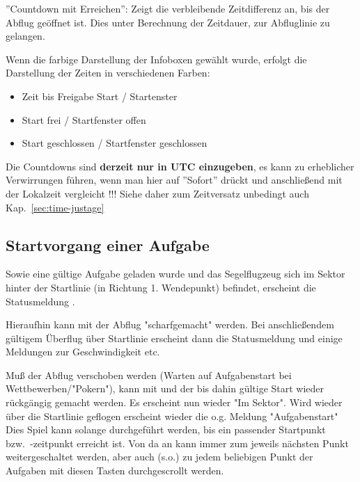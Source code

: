 ''Countdown mit Erreichen'':
Zeigt die verbleibende Zeitdifferenz an, bis der Abflug geöffnet ist. 
Dies unter Berechnung der Zeitdauer, zur Abfluglinie zu gelangen. 


Wenn die farbige Darstellung der Infoboxen gewählt wurde, erfolgt die Darstellung der Zeiten in verschiedenen 
Farben:

\begin{itemize}
 \item[]   Zeit bis Freigabe Start / Startenster
 \item[]   Start frei / Startfenster offen 
 \item[]   Start geschlossen / Startfenster geschlossen
 \end{itemize}

 Die Countdowns sind \textbf{derzeit nur in UTC einzugeben}, es kann zu erheblicher 
 \warning 
 Verwirrungen führen, wenn man hier auf ''Sofort'' drückt und anschließend mit der Lokalzeit vergleicht !!! Siehe daher zum Zeitversatz unbedingt auch Kap.~\ref{sec:time-justage}


\subsection*{Startvorgang einer Aufgabe}

Sowie eine gültige Aufgabe geladen wurde und das Segelflugzeug sich im Sektor hinter der Startlinie (in Richtung 1. Wendepunkt) befindet, erscheint die Statusmeldung .

Hieraufhin kann mit  der Abflug "scharfgemacht" werden. Bei anschließendem gültigem Überflug über Startlinie erscheint dann die Statusmeldung    und einige Meldungen zur  Geschwindigkeit etc.

Muß der Abflug verschoben werden (Warten auf Aufgabenstart bei Wettbewerben/"Pokern"), kann mit  und  der bis dahin gültige Start wieder rückgängig gemacht werden. Es erscheint nun wieder "Im Sektor".
Wird wieder über die Startlinie geflogen erscheint wieder die o.g. Meldung "Aufgabenstart"  Dies Spiel kann solange durchgeführt werden, bis ein passender Startpunkt bzw.\ -zeitpunkt  erreicht ist. Von da an kann immer zum jeweils nächsten Punkt weitergeschaltet werden, aber auch (s.o.) zu jedem beliebigen Punkt der Aufgaben  mit diesen Tasten durchgescrollt werden.

